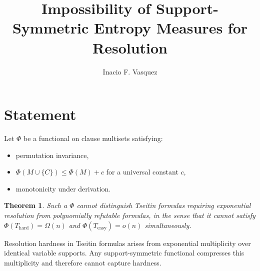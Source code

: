 \documentclass[11pt]{article}
\title{Impossibility of Support-Symmetric Entropy Measures for Resolution}
\author{Inacio F. Vasquez}
\date{}
\newtheorem{theorem}{Theorem}
\begin{document}
\maketitle

\section*{Statement}

Let $\Phi$ be a functional on clause multisets satisfying:

\begin{itemize}
\item[(P1)] permutation invariance,
\item[(P2)] $\Phi(M \cup \{C\}) \le \Phi(M) + c$ for a universal constant $c$,
\item[(P3)] monotonicity under derivation.
\end{itemize}

\begin{theorem}
Such a $\Phi$ cannot distinguish Tseitin formulas
requiring exponential resolution
from polynomially refutable formulas,
in the sense that it cannot satisfy
$\Phi(T_{\mathrm{hard}})=\Omega(n)$ and
$\Phi(T_{\mathrm{easy}})=o(n)$ simultaneously.
\end{theorem}

\noindent
Resolution hardness in Tseitin formulas
arises from exponential multiplicity
over identical variable supports.
Any support-symmetric functional
compresses this multiplicity
and therefore cannot capture hardness.
\end{document}
